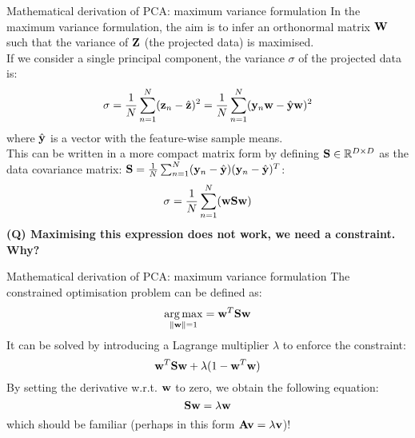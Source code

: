 \documentclass[aspectratio=169,notes]{beamer}
\begin{document}
	\begin{frame}{Mathematical derivation of PCA: maximum variance formulation}
	In the maximum variance formulation, the aim is to infer an orthonormal matrix ${\bf W}$ such that the variance of ${\bf Z}$ (the projected data) is maximised.\\
	If we consider a single principal component, the variance $\sigma$ of the projected data is:
	\begin{equation}
		\sigma = \frac{1}{N}\sum_{n=1}^{N} ({\bf z}_n - \hat{{\bf z}})^{2} = \frac{1}{N}\sum_{n=1}^{N} ({\bf y}_n {\bf w} - \hat{{\bf y}}{\bf w})^{2}
	\end{equation}
	where $\hat{{\bf y}}$ is a vector with the feature-wise sample means.\\
	This can be written in a more compact matrix form by defining ${\bf S} \in \mathbb{R}^{D \times D}$ as the data covariance matrix: ${\bf S} = \frac{1}{N}\sum_{n=1}^{N} ({\bf y}_n - \hat{{\bf y}})({\bf y}_n - \hat{{\bf y}})^T$: %
	\begin{equation}
		\sigma = \frac{1}{N}\sum_{n=1}^{N} ({\bf w} {\bf S} {\bf w})
	\end{equation}
	\textbf{(Q) Maximising this expression does not work, we need a constraint. Why?}
	\end{frame}


	\begin{frame}{Mathematical derivation of PCA: maximum variance formulation}
	The constrained optimisation problem can be defined as:
	\begin{equation}
		\operatorname*{arg\,max}_{\|{\bf w}\|=1} = {\bf w}^T {\bf S} {\bf w}
	\end{equation}
	It can be solved by introducing a Lagrange multiplier $\lambda$ to enforce the constraint:
	\begin{equation}
		{\bf w}^T {\bf S} {\bf w} + \lambda (1-{\bf w}^T{\bf w})
	\end{equation}
	By setting the derivative w.r.t. ${\bf w}$ to zero, we obtain the following equation:
	\begin{equation}
		{\bf S} {\bf w} = \lambda {\bf w}
	\end{equation}
	which should be familiar (perhaps in this form ${\bf A} {\bf v} = \lambda {\bf v}$)!
	\end{frame}
\end{document}
